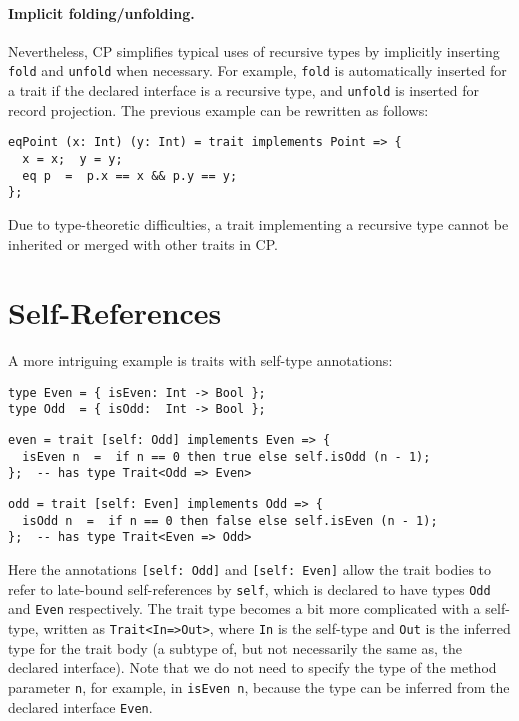 \paragraph{Implicit folding/unfolding.}
Nevertheless, CP simplifies typical uses of recursive types by implicitly
inserting \lstinline{fold} and \lstinline{unfold} when necessary. For example,
\lstinline{fold} is automatically inserted for a trait if the declared interface
is a recursive type, and \lstinline{unfold} is inserted for record projection.
The previous example can be rewritten as follows:
\begin{lstlisting}
eqPoint (x: Int) (y: Int) = trait implements Point => {
  x = x;  y = y;
  eq p  =  p.x == x && p.y == y;
};
\end{lstlisting}

\begin{tipblock}
Due to type-theoretic difficulties, a trait implementing a recursive type cannot
be inherited or merged with other traits in CP.
\end{tipblock}

\section{Self-References}

A more intriguing example is traits with self-type annotations:
\begin{lstlisting}
type Even = { isEven: Int -> Bool };
type Odd  = { isOdd:  Int -> Bool };
\end{lstlisting}
\vspace{-1ex}
\begin{lstlisting}
even = trait [self: Odd] implements Even => {
  isEven n  =  if n == 0 then true else self.isOdd (n - 1);
};  -- has type Trait<Odd => Even>
\end{lstlisting}
\vspace{-1ex}
\begin{lstlisting}
odd = trait [self: Even] implements Odd => {
  isOdd n  =  if n == 0 then false else self.isEven (n - 1);
};  -- has type Trait<Even => Odd>
\end{lstlisting}
Here the annotations \lstinline{[self: Odd]} and \lstinline{[self: Even]} allow
the trait bodies to refer to late-bound self-references by \lstinline{self},
which is declared to have types \lstinline{Odd} and \lstinline{Even}
respectively. The trait type becomes a bit more complicated with a self-type,
written as \lstinline{Trait<In=>Out>}, where \lstinline{In} is the self-type and
\lstinline{Out} is the inferred type for the trait body (a subtype of, but not
necessarily the same as, the declared interface). Note that we do not need to
specify the type of the method parameter \lstinline{n}, for example, in
\lstinline{isEven n}, because the type can be inferred from the declared
interface \lstinline{Even}.

